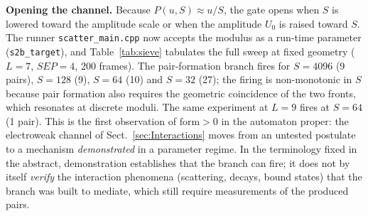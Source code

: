 \documentclass{ijuc}
\begin{document}
\textbf{Opening the channel.}  Because $P(u,S)\approx u/S$, the gate opens when $S$ is lowered toward the amplitude scale or when the amplitude $U_0$ is raised toward $S$.  The runner \texttt{scatter\_main.cpp} now accepts the modulus as a run-time parameter (\texttt{s2b\_target}), and Table~\ref{tab:sieve} tabulates the full sweep at fixed geometry ($L=7$, $SEP=4$, $200$ frames).  The pair-formation branch fires for $S=4096$ (9 pairs), $S=128$ (9), $S=64$ (10) and $S=32$ (27); the firing is non-monotonic in $S$ because pair formation also requires the geometric coincidence of the two fronts, which resonates at discrete moduli.  The same experiment at $L=9$ fires at $S=64$ (1 pair).  This is the first observation of $\mathrm{form}>0$ in the automaton proper: the electroweak channel of Sect.~\ref{sec:Interactions} moves from an untested postulate to a mechanism \emph{demonstrated} in a parameter regime.  In the terminology fixed in the abstract, demonstration establishes that the branch can fire; it does not by itself \emph{verify} the interaction phenomena (scattering, decays, bound states) that the branch was built to mediate, which still require measurements of the produced pairs.
\end{document}

